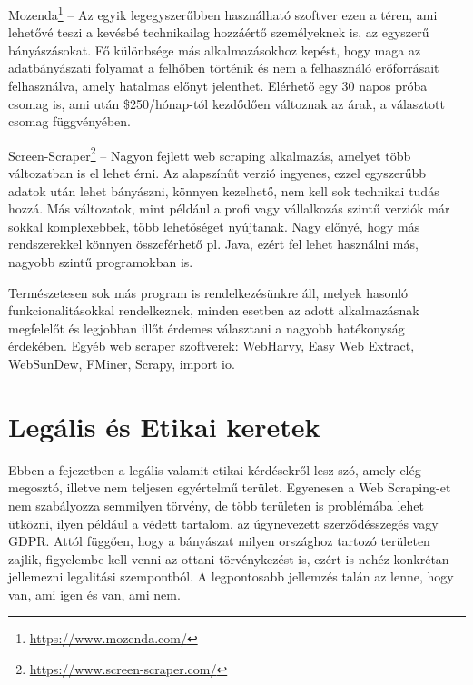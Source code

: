 Mozenda\footnote{\url{https://www.mozenda.com/}} – Az egyik legegyszerűbben használható szoftver ezen a téren, ami lehetővé teszi a kevésbé technikailag hozzáértő személyeknek is, az egyszerű bányászásokat. Fő különbsége más alkalmazásokhoz kepést, hogy maga az adatbányászati folyamat a felhőben történik és nem a felhasználó erőforrásait felhasználva, amely hatalmas előnyt jelenthet. Elérhető egy 30 napos próba csomag is, ami után \$250/hónap-tól kezdődően változnak az árak, a választott csomag függvényében.

Screen-Scraper\footnote{\url{https://www.screen-scraper.com/}} – Nagyon fejlett web scraping alkalmazás, amelyet több változatban is el lehet érni. Az alapszínűt verzió ingyenes, ezzel egyszerűbb adatok után lehet bányászni, könnyen kezelhető, nem kell sok technikai tudás hozzá. Más változatok, mint például a profi vagy vállalkozás szintű verziók már sokkal komplexebbek, több lehetőséget nyújtanak. Nagy előnyé, hogy más rendszerekkel könnyen összeférhető pl. Java, ezért fel lehet használni más, nagyobb szintű programokban is.


Természetesen sok más program is rendelkezésünkre áll, melyek hasonló funkcionalitásokkal rendelkeznek, minden esetben az adott alkalmazásnak megfelelőt és legjobban illőt érdemes választani a nagyobb hatékonyság érdekében. Egyéb web scraper szoftverek\cite{sirisuriya2015comparative}: WebHarvy, Easy Web Extract, WebSunDew, FMiner, Scrapy, import io. 


\section{Legális és Etikai keretek}

Ebben a fejezetben a legális valamit etikai kérdésekről lesz szó, amely elég megosztó, illetve nem teljesen egyértelmű terület. Egyenesen a Web Scraping-et nem szabályozza semmilyen törvény, de több területen is problémába lehet ütközni, ilyen például a védett tartalom, az úgynevezett szerződésszegés vagy GDPR. Attól függően, hogy a bányászat milyen országhoz tartozó területen zajlik, figyelembe kell venni az ottani törvénykezést is, ezért is nehéz konkrétan jellemezni legalitási szempontból. A legpontosabb jellemzés talán az lenne, hogy van, ami igen és van, ami nem.

